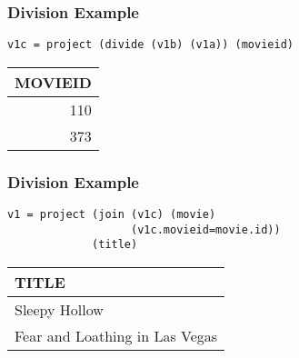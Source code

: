\documentclass[dvipsnames]{beamer}
\theoremstyle{plain}
\begin{document}
\begin{frame}[fragile]
  \frametitle{Division Example}

  \begin{example}
    \begin{lstlisting}
v1c = project (divide (v1b) (v1a)) (movieid)
    \end{lstlisting}

    \pause
    \begin{tiny}
    \begin{table}
      \begin{tabular}{|r|}\hline
MOVIEID\\\hline\hline
    110\\\hline
    373\\\hline
      \end{tabular}
    \end{table}
    \end{tiny}
  \end{example}
\end{frame}

\begin{frame}[fragile]
  \frametitle{Division Example}

  \begin{example}
    \begin{lstlisting}
v1 = project (join (v1c) (movie)
                   (v1c.movieid=movie.id))
             (title)
    \end{lstlisting}

    \pause
    \begin{tiny}
    \begin{table}
      \begin{tabular}{|l|}\hline
TITLE                         \\\hline\hline
Sleepy Hollow                 \\\hline
Fear and Loathing in Las Vegas\\\hline
      \end{tabular}
    \end{table}
    \end{tiny}
  \end{example}
\end{frame}
\end{document}
